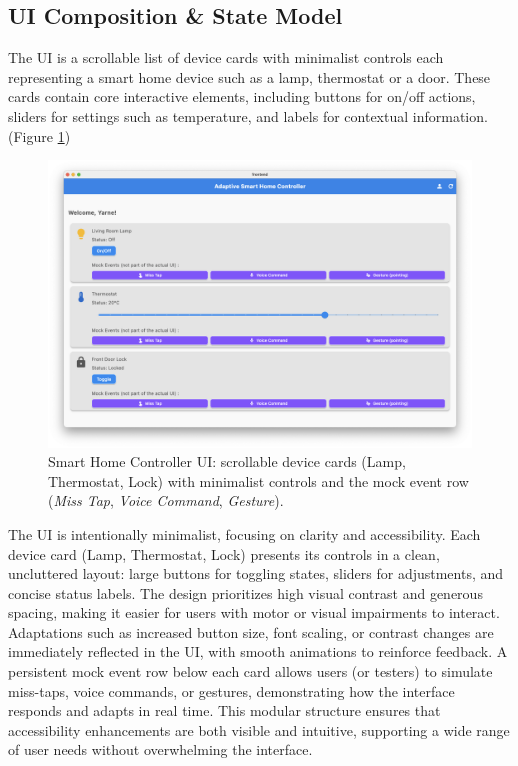 \documentclass[openany]{book}
\begin{document}
\subsection{UI Composition \& State Model}
The UI is a scrollable list of device cards with minimalist controls each representing a smart home device such as a lamp, thermostat or a door. These cards contain core interactive elements, including buttons for on/off actions, sliders for settings such as temperature, and labels for contextual information. (Figure \ref{fig:ui_overview})

\begin{figure}[H]
\centering
\includegraphics[width=.9\linewidth]{images/fig_ui_overview.png}
\caption{Smart Home Controller UI: scrollable device cards (Lamp, Thermostat, Lock) with minimalist controls and the mock event row (\emph{Miss Tap}, \emph{Voice Command}, \emph{Gesture}).}
\label{fig:ui_overview}
\end{figure}

The UI is intentionally minimalist, focusing on clarity and accessibility. Each device card (Lamp, Thermostat, Lock) presents its controls in a clean, uncluttered layout: large buttons for toggling states, sliders for adjustments, and concise status labels. The design prioritizes high visual contrast and generous spacing, making it easier for users with motor or visual impairments to interact. Adaptations such as increased button size, font scaling, or contrast changes are immediately reflected in the UI, with smooth animations to reinforce feedback. A persistent mock event row below each card allows users (or testers) to simulate miss-taps, voice commands, or gestures, demonstrating how the interface responds and adapts in real time. This modular structure ensures that accessibility enhancements are both visible and intuitive, supporting a wide range of user needs without overwhelming the interface.
\end{document}
